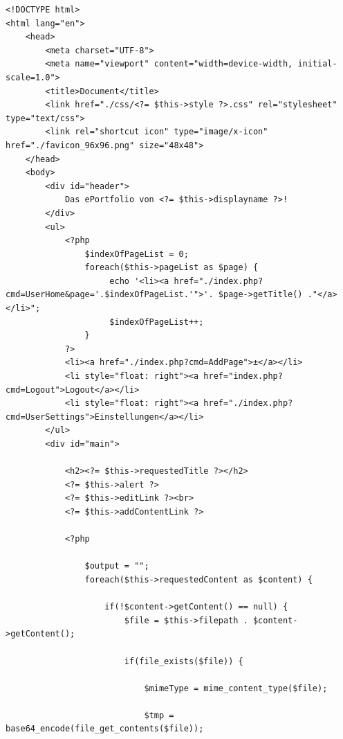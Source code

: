 \documentclass[10.5pt]{scrarticle}
\begin{document}
\begin{lstlisting}[caption={UserHome.php}, label={lst:UserHome}]
<!DOCTYPE html>
<html lang="en">
    <head>
        <meta charset="UTF-8">
        <meta name="viewport" content="width=device-width, initial-scale=1.0">
        <title>Document</title>
        <link href="./css/<?= $this->style ?>.css" rel="stylesheet" type="text/css">
        <link rel="shortcut icon" type="image/x-icon" href="./favicon_96x96.png" size="48x48">
    </head>
    <body>
        <div id="header">
            Das ePortfolio von <?= $this->displayname ?>!
        </div>
        <ul>
            <?php 
                $indexOfPageList = 0;
                foreach($this->pageList as $page) {
                     echo '<li><a href="./index.php?cmd=UserHome&page='.$indexOfPageList.'">'. $page->getTitle() ."</a></li>"; 
                     $indexOfPageList++;
                }
            ?>
            <li><a href="./index.php?cmd=AddPage">±</a></li>
            <li style="float: right"><a href="index.php?cmd=Logout">Logout</a></li>
            <li style="float: right"><a href="./index.php?cmd=UserSettings">Einstellungen</a></li>
        </ul>
        <div id="main">

            <h2><?= $this->requestedTitle ?></h2>
            <?= $this->alert ?>
            <?= $this->editLink ?><br>
            <?= $this->addContentLink ?>

            <?php

                $output = "";
                foreach($this->requestedContent as $content) {

                    if(!$content->getContent() == null) {
                        $file = $this->filepath . $content->getContent();

                        if(file_exists($file)) {

                            $mimeType = mime_content_type($file);

                            $tmp = base64_encode(file_get_contents($file));


\end{lstlisting}
\end{document}
